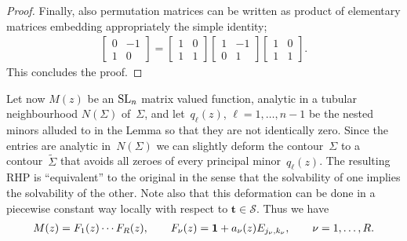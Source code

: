 \documentclass[pdftex]{sigma}
\numberwithin{equation}{section}
\def\wt{\widetilde}
\def\1{{\bf 1}}
\def \t{\mathbf t}
\begin{document}
\begin{proof}
Finally, also permutation matrices can be written as product of elementary matrices embedding appropriately the simple identity;
\begin{gather*}
\left[
\begin{matrix}
0 & -1 \\ 1 & 0
\end{matrix}
\right]
=
\left[
\begin{matrix}
1 & 0 \\ 1 & 1
\end{matrix}
\right]
\left[
\begin{matrix}
1 & -1 \\ 0 & 1
\end{matrix}
\right]
\left[
\begin{matrix}
1 &0 \\ 1 & 1
\end{matrix}
\right].
\end{gather*}
This concludes the proof.
\end{proof}

Let now $M(z)$ be an ${\rm SL}_n$ matrix valued function, analytic in a tubular neighbourhood $N(\Sigma)$ of~$\Sigma$, and let~$q_\ell(z)$, $\ell=1,\dots, n-1$ be the nested minors alluded to in the Lemma so that they are not identically zero. Since the entries are analytic in~$N(\Sigma)$ we can slightly deform the contour~$\Sigma$ to a contour~$\wt \Sigma$ that avoids all zeroes of every principal minor~$q_\ell(z)$. The resulting RHP is ``equivalent'' to the original in the sense that the solvability of one implies the solvability of the other. Note also that this deformation can be done in a piecewise constant way locally with respect to $\t\in \mathcal S$. Thus we have
\begin{gather*}
M(z) = F_1(z) \cdots F_R(z),\qquad F_\nu(z) = \1 + a_\nu (z) E_{j_\nu,k_\nu} ,\qquad \nu = 1,\dots, R.
\end{gather*}
\end{document}
